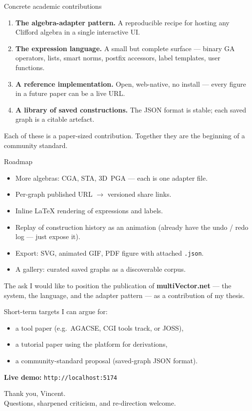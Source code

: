\documentclass[aspectratio=169,11pt]{beamer}
\begin{document}
\begin{frame}{Concrete academic contributions}
  \begin{enumerate}
    \item \textbf{The algebra-adapter pattern.} A reproducible recipe
          for hosting any Clifford algebra in a single interactive UI.
    \item \textbf{The expression language.} A small but complete
          surface — binary GA operators, lists, smart norms, postfix
          accessors, label templates, user functions.
    \item \textbf{A reference implementation.} Open, web-native, no
          install — every figure in a future paper can be a live URL.
    \item \textbf{A library of saved constructions.} The JSON format is
          stable; each saved graph is a citable artefact.
  \end{enumerate}

  \medskip
  Each of these is a paper-sized contribution. Together they are the
  beginning of a community standard.
\end{frame}

\begin{frame}{Roadmap}
  \begin{itemize}
    \item More algebras: CGA, STA, 3D~PGA — each is one adapter file.
    \item Per-graph published URL \(\rightarrow\) versioned share links.
    \item Inline LaTeX rendering of expressions and labels.
    \item Replay of construction history as an animation
          (already have the undo / redo log — just expose it).
    \item Export: SVG, animated GIF, PDF figure with attached \texttt{.json}.
    \item A gallery: curated saved graphs as a discoverable corpus.
  \end{itemize}
\end{frame}

\begin{frame}{The ask}
  I would like to position the publication of
  \textbf{multiVector.net} —
  the system, the language, and the adapter pattern —
  as a contribution of my thesis.

  \medskip
  Short-term targets I can argue for:
  \begin{itemize}
    \item a tool paper (e.g.\ AGACSE, CGI tools track, or JOSS),
    \item a tutorial paper using the platform for derivations,
    \item a community-standard proposal (saved-graph JSON format).
  \end{itemize}

  \medskip
  \centering
  \alert{\textbf{Live demo:} \texttt{http://localhost:5174}}
\end{frame}

\begin{frame}[standout]
  Thank you, Vincent.\\[4pt]
  \footnotesize\normalfont
  Questions, sharpened criticism, and re-direction welcome.
\end{frame}
\end{document}
